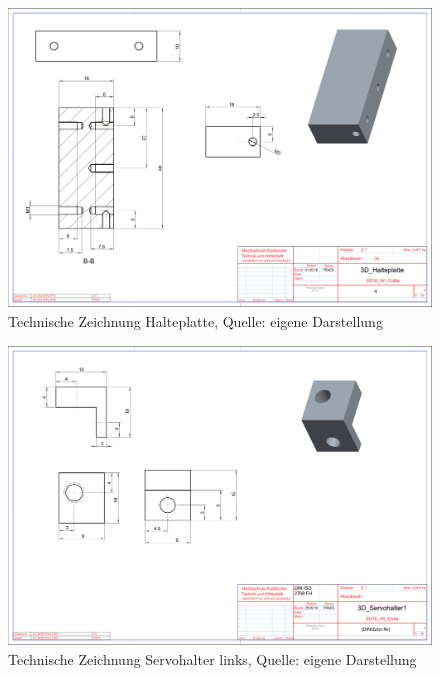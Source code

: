 \begin{landscape}
	\begin{figure} 
	\begin{center}
	\includegraphics[width=1.5\textwidth]{img/3d_halteplatte.pdf}
	\end{center}
	\caption{Technische Zeichnung Halteplatte, Quelle: eigene Darstellung}
	\end{figure} 
	
	\begin{figure} 
	\begin{center}
	\includegraphics[width=1.5\textwidth]{img/3d_servohalter1.pdf}
	\end{center}
	\caption{Technische Zeichnung Servohalter links, Quelle: eigene Darstellung}
	\end{figure} 
	

\end{landscape}
